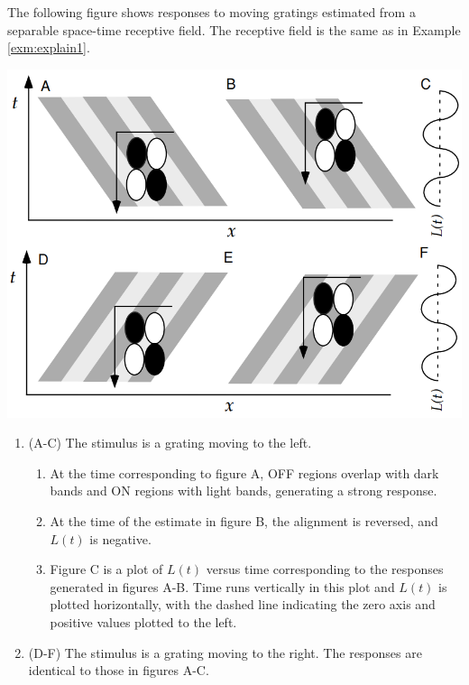 \begin{exm}
  \label{exm:explain2}
  The following figure shows responses to moving gratings estimated from a separable space-time receptive field. The receptive field is the same as in Example \ref{exm:explain1}.
  \begin{center}
    \includegraphics[scale=0.27]{./png/responseSelectivityExplain2}
  \end{center}
  \begin{enumerate}[]
  \item (A-C) The stimulus is a grating moving to the left.
    \begin{enumerate}[-]
    \item At the time corresponding to figure A, OFF regions overlap with dark bands and ON regions with light bands, generating a strong response.
    \item At the time of the estimate in figure B, the alignment is reversed, and $L(t)$ is negative.
    \item Figure C is a plot of $L(t)$ versus time corresponding to the responses generated in figures A-B. Time runs vertically in this plot and $L(t)$ is plotted horizontally, with the dashed line indicating the zero axis and positive values plotted to the left.
    \end{enumerate}
  \item (D-F) The stimulus is a grating moving to the right. The responses are identical to those in figures A-C.
  \end{enumerate}
\end{exm}

